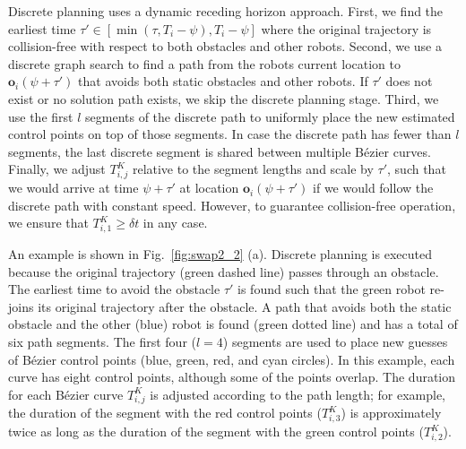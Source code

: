 \documentclass{svproc}
\newcommand{\vo}{\mathbf{o}}
\begin{document}
Discrete planning uses a dynamic receding horizon approach. First, we find the earliest time $\tau'\in [\min(\tau, T_i-\psi), T_i-\psi]$ where the original trajectory is collision-free with respect to both obstacles and other robots.
Second, we use a discrete graph search to find a path from the robots current location to $\vo_i(\psi+\tau')$ that avoids both static obstacles and other robots.
If $\tau'$ does not exist or no solution path exists, we skip the discrete planning stage.
Third, we use the first $l$ segments of the discrete path to uniformly place the new estimated control points on top of those segments.
In case the discrete path has fewer than $l$ segments, the last discrete segment is shared between multiple B\'ezier curves.
Finally, we adjust $T_{i,j}^K$ relative to the segment lengths and scale by $\tau'$, such that we would arrive at time $\psi+\tau'$ at location $\vo_i(\psi+\tau')$ if we would follow the discrete path with constant speed.
However, to guarantee collision-free operation, we ensure that $T_{i,1}^K\geq \delta t$ in any case.

An example is shown in Fig.~\ref{fig:swap2_2} (a). 
Discrete planning is executed because the original trajectory (green dashed line) passes through an obstacle.
The earliest time to avoid the obstacle $\tau'$ is found such that the green robot re-joins its original trajectory after the obstacle.
A path that avoids both the static obstacle and the other (blue) robot is found (green dotted line) and has a total of six path segments.
The first four ($l=4$) segments are used to place new guesses of B\'ezier control points (blue, green, red, and cyan circles).
In this example, each curve has eight control points, although some of the points overlap.
The duration for each B\'ezier curve $T^{K}_{i,j}$ is adjusted according to the path length; for example, the duration of the segment with the red control points ($T_{i,3}^K$) is approximately twice as long as the duration of the segment with the green control points ($T_{i,2}^K$).
\end{document}
